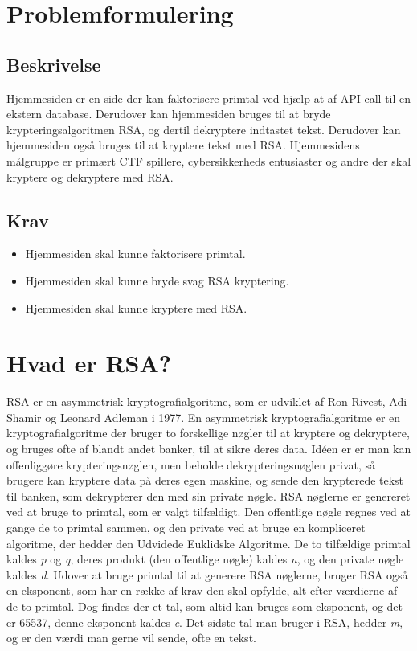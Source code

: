\documentclass[a4paper,12pt]{extarticle}
\begin{document}
    \tableofcontents

    \newpage


    \section{Problemformulering}\label{sec:problemformulering}

    \subsection{Beskrivelse}\label{subsec:beskrivelse}
    Hjemmesiden er en side der kan faktorisere primtal ved hjælp at af API call til en ekstern database.
    Derudover kan hjemmesiden bruges til at bryde krypteringsalgoritmen RSA, og dertil dekryptere indtastet tekst.
    Derudover kan hjemmesiden også bruges til at kryptere tekst med RSA. Hjemmesidens målgruppe er primært CTF
    spillere, cybersikkerheds entusiaster og andre der skal kryptere og dekryptere med RSA\@.

    \subsection{Krav}\label{subsec:krav}
    \begin{itemize}
        \item Hjemmesiden skal kunne faktorisere primtal.
        \item Hjemmesiden skal kunne bryde svag RSA kryptering.
        \item Hjemmesiden skal kunne kryptere med RSA\@.
    \end{itemize}


    \section{Hvad er RSA?}\label{sec:hvad-er-rsa}
    RSA er en asymmetrisk kryptografialgoritme, som er udviklet af Ron Rivest, Adi Shamir og Leonard Adleman i 1977.
    En asymmetrisk kryptografialgoritme er en kryptografialgoritme der bruger to forskellige nøgler til at kryptere og dekryptere,
    og bruges ofte af blandt andet banker, til at sikre deres data.
    Idéen er er man kan offenliggøre krypteringsnøglen, men beholde dekrypteringsnøglen privat, så brugere kan kryptere data på deres egen maskine,
    og sende den krypterede tekst til banken, som dekrypterer den med sin private nøgle.
    RSA nøglerne er genereret ved at bruge to primtal, som er valgt tilfældigt.
    Den offentlige nøgle regnes ved at gange de to primtal sammen, og den private ved at bruge en kompliceret algoritme,
    der hedder den Udvidede Euklidske Algoritme.\@
    De to tilfældige primtal kaldes \emph{p} og \emph{q}, deres produkt (den offentlige nøgle) kaldes \emph{n}, og den private nøgle kaldes \emph{d}.
    Udover at bruge primtal til at generere RSA nøglerne, bruger RSA også en eksponent, som har en række af krav den skal opfylde,
    alt efter værdierne af de to primtal.
    Dog findes der et tal, som altid kan bruges som eksponent, og det er 65537, denne eksponent kaldes \emph{e}.
    Det sidste tal man bruger i RSA, hedder \emph{m}, og er den værdi man gerne vil sende, ofte en tekst.\@
\end{document}
